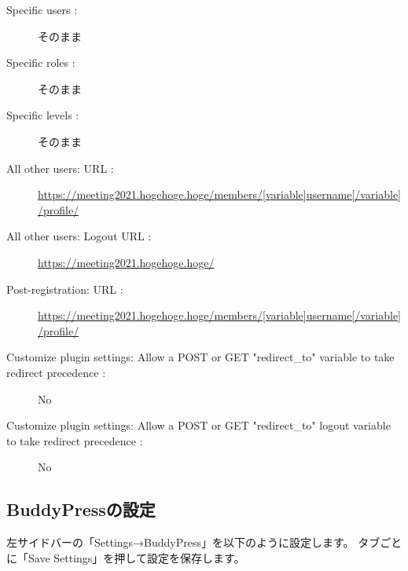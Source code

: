 \documentclass[titlepage,10pt,a4paper,uplatex]{jsbook}
\begin{document}
\begin{description}
\item[Specific users : ] そのまま
\item[Specific roles : ] そのまま
\item[Specific levels : ] そのまま
\item[All other users: URL : ] \url{https://meeting2021.hogehoge.hoge/members/[variable]username[/variable]/profile/}
\item[All other users: Logout URL : ] \url{https://meeting2021.hogehoge.hoge/}
\item[Post-registration: URL : ] \url{https://meeting2021.hogehoge.hoge/members/[variable]username[/variable]/profile/}
\item[Customize plugin settings: Allow a POST or GET "redirect\_to" variable to take redirect precedence : ] No
\item[Customize plugin settings: Allow a POST or GET "redirect\_to" logout variable to take redirect precedence : ] No
\end{description}

\subsection{BuddyPressの設定}

左サイドバーの「Settings→BuddyPress」を以下のように設定します。
タブごとに「Save Settings」を押して設定を保存します。
\end{document}
